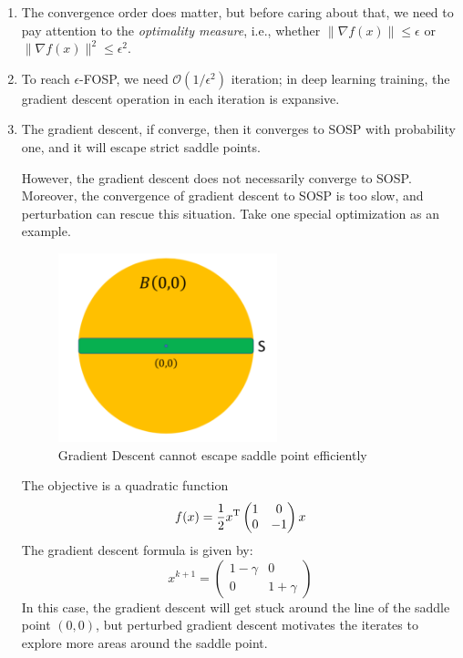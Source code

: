 \begin{remark}
\begin{enumerate}
\item
The convergence order does matter, but before caring about that, we need to pay attention to the \emph{optimality measure}, i.e., whether $\|\nabla f(x)\|\le\epsilon$ or $\|\nabla f(x)\|^2\le\epsilon^2$.
\item
To reach $\epsilon$-FOSP, we need $\mathcal{O}(1/\epsilon^2)$ iteration;
in deep learning training, the gradient descent operation in each iteration is expansive.
\item
The gradient descent, if converge, then it converges to SOSP with probability one, and it will 
escape strict saddle points.

However, the gradient descent does not necessarily converge to SOSP. 
Moreover, the convergence of gradient descent to SOSP is too slow, and perturbation can rescue this situation.
Take one special optimization as an example.
\begin{figure}[H]
\centering
\includegraphics[width=0.6\textwidth]{Eigth_lecture/f_4}
\caption{Gradient Descent cannot escape saddle point efficiently}
\end{figure}
The objective is a quadratic function
\[
f(x)=\frac{1}{2}x^{\mathrm T}\begin{pmatrix}
1&0\\0&-1
\end{pmatrix}x
\]
The gradient descent formula is given by:
\[
x^{k+1}=\begin{pmatrix}
1-\gamma&0\\0&1+\gamma
\end{pmatrix}
\]
In this case, the gradient descent will get stuck around the line of the saddle point $(0,0)$,
but perturbed gradient descent motivates the iterates to explore more areas around the saddle point.
\end{enumerate}
\end{remark}

